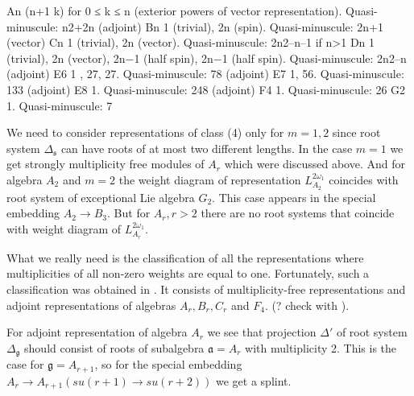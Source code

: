 \documentclass{article}
\newcommand{\gf}{\mathfrak{g}}
\newcommand{\af}{\mathfrak{a}}
\newcommand{\sfr}{\mathfrak{s}}
\begin{document}
    An (n+1
    k) for 0 ≤ k ≤ n (exterior powers of vector representation). Quasi-minuscule: n2+2n (adjoint)
    Bn 1 (trivial), 2n (spin). Quasi-minuscule: 2n+1 (vector)
    Cn 1 (trivial), 2n (vector). Quasi-minuscule: 2n2–n–1 if n>1
    Dn 1 (trivial), 2n (vector), 2n−1 (half spin), 2n−1 (half spin). Quasi-minuscule: 2n2–n (adjoint)
    E6 1 , 27, 27. Quasi-minuscule: 78 (adjoint)
    E7 1, 56. Quasi-minuscule: 133 (adjoint)
    E8 1. Quasi-minuscule: 248 (adjoint)
    F4 1. Quasi-minuscule: 26
    G2 1. Quasi-minuscule: 7


We need to consider representations of class (4) only for $m=1,2$ since root system $\Delta_{\sfr}$
can have roots of at most two different lengths. In the case $m=1$ we get strongly multiplicity free
modules of $A_{r}$ which were discussed above. And for algebra $A_{2}$ and $m=2$ the weight diagram
of representation $L^{2\omega_{1}}_{A_{2}}$ coincides with root system of exceptional Lie algebra
$G_{2}$. This case appears in the special embedding $A_{2}\to B_{3}$. But for $A_{r}, r>2$ there are
no root systems that coincide with weight diagram of $L^{2\omega_{1}}_{A_{r}}$. 


What we really need is the classification of all the representations where multiplicities of all
non-zero weights are equal to one. Fortunately, such a classification was obtained in
\cite{plotkin1998visual}. It consists of multiplicity-free representations and adjoint
representations of algebras $A_{r}, B_{r}, C_{r}$ and $F_{4}$.  (? check with
\cite{berenshtein1990multiplicity}). 

For adjoint representation of algebra $A_{r}$ we see that projection $\Delta'$ of root system
$\Delta_{\gf}$ should consist of roots of subalgebra $\af=A_{r}$ with multiplicity 2. This is the
case for $\gf=A_{r+1}$, so for the special embedding $A_{r}\to A_{r+1} (su(r+1)\to su(r+2))$ we get
a splint. 
\end{document}
